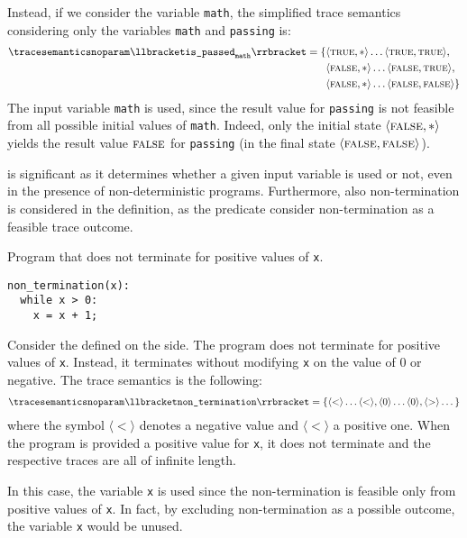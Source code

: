 \begin{example}
Instead, if we consider the variable \texttt{math}, the simplified trace semantics considering only the variables \texttt{math} and \texttt{passing} is:
\begin{align*}
  \tracesemanticsnoparam\semanticsof{\texttt{is\_passed}_\texttt{math}}
  =
  \{
    &\tuple\true\anyvalue\dots\tuple\true\true, \\
    &\tuple\false\anyvalue\dots\tuple\false\true, \\
    &\tuple\false\anyvalue\dots\tuple\false\false
  \}
\end{align*}
The input variable \texttt{math} is used, since the result value for \texttt{passing} is not feasible from all possible initial values of \texttt{math}.
Indeed, only the initial state $\langle \textsc{false}, {*} \rangle$ yields the result value $\textsc{false}$ for \texttt{passing} (in the final state $\langle \textsc{false}, \textsc{false} \rangle$).
\end{example}

 is significant as it determines whether a given input variable is used or not, even in the presence of non-deterministic programs.
Furthermore, also non-termination is considered in the definition, as the predicate consider non-termination as a feasible trace outcome.

\begin{example}
  \begin{marginlisting}
    \caption{Program that does not terminate for positive values of \texttt{x}.}
    \vspace{10pt}
  \begin{lstlisting}
non_termination(x):
  while x > 0:
    x = x + 1;
\end{lstlisting}
  \end{marginlisting}
  Consider the  defined on the side. The program does not terminate for positive values of \texttt{x}. Instead, it terminates without modifying \texttt{x} on the value of $0$ or negative. The trace semantics is the following:
  \begin{align*}
    \tracesemanticsnoparam\semanticsof{\texttt{non\_termination}}
    =
    \{
      \langle{<}\rangle\dots\langle{<}\rangle,
      \langle{0}\rangle\dots\langle{0}\rangle,
      \langle{>}\rangle\dots
    \}
  \end{align*}
  where the symbol $\langle{<}\rangle$ denotes a negative value and $\langle{<}\rangle$ a positive one. When the program is provided a positive value for \texttt{x}, it does not terminate and the respective traces are all of infinite length.

  In this case, the variable \texttt{x} is used since the non-termination is feasible only from positive values of \texttt{x}.
  In fact, by excluding non-termination as a possible outcome, the variable \texttt{x} would be unused.
\end{example}

